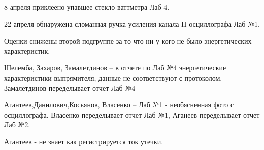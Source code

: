 \documentclass[a4paper,11pt]{article}
\begin{document}
\vskip 1cm
8 апреля приклеено упавшее стекло ваттметра Лаб 4.

22 апреля обнаружена сломанная ручка усиления канала II осциллографа Лаб №1.

Оценки снижены второй подгруппе за то что ни у кого не было энергетических 
характеристик.

Шелемба, Захаров, Замалетдинов -- в отчете по Лаб №4 
энергетические характеристики выпрямителя,
данные не соответствуют с протоколом. Замалетдинов переделывает отчет Лаб №4

Агантеев,Данилович,Косьянов, Власенко -- Лаб №1 - необясненная фото с осциллографа.
Власенко переделывает отчет Лаб №1, Аганеев переделывает отчет Лаб №2.

Агантеев - не знает как регистрируется ток утечки.
\end{document}
